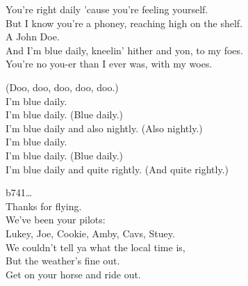 You're right daily 'cause you're feeling yourself. \\
But I know you're a phoney, reaching high on the shelf. \\
A John Doe. \\
And I'm blue daily, kneelin' hither and yon, to my foes. \\
You're no you-er than I ever was, with my woes. \\


(Doo, doo, doo, doo, doo.) \\
I'm blue daily. \\
I'm blue daily. (Blue daily.) \\
I'm blue daily and also nightly. (Also nightly.) \\
I'm blue daily. \\
I'm blue daily. (Blue daily.) \\
I'm blue daily and quite rightly. (And quite rightly.) \\


b741… \\

Thanks for flying. \\
We've been your pilots: \\
Lukey, Joe, Cookie, Amby, Cavs, Stuey. \\

We couldn't tell ya what the local time is, \\
But the weather's fine out. \\
Get on your horse and ride out. \\
